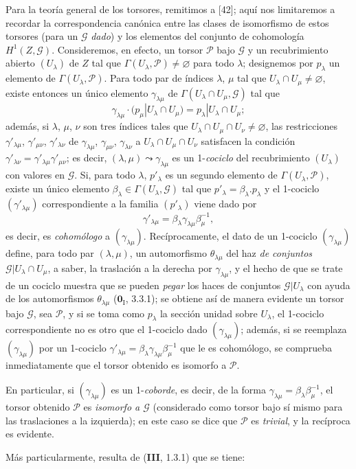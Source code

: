 \begin{env}[16.5.15]
Para la teoría general de los torsores, remitimos a [42]; aquí nos
limitaremos a recordar la correspondencia canónica entre las clases
de isomorfismo de estos torsores (para un $\mathscr{G}$ \emph{dado}) y los elementos del
conjunto de cohomología $H^1(Z,\mathscr{G})$. Consideremos, en efecto, un
torsor $\mathscr{P}$ bajo $\mathscr{G}$ y un recubrimiento abierto
$(U_\lambda)$ de $Z$ tal que
$\Gamma(U_\lambda,\mathscr{P})\neq\varnothing$ para todo $\lambda$;
designemos por $p_\lambda$ un elemento de
$\Gamma(U_\lambda,\mathscr{P})$. Para todo par de índices $\lambda$, $\mu$
tal que $U_\lambda\cap U_\mu\neq\varnothing$, existe entonces un único elemento
$\gamma_{\lambda\mu}$ de
$\Gamma(U_\lambda\cap U_\mu,\mathscr{G})$ tal que
\[
  \gamma_{\lambda\mu}\cdot
  (p_\mu|U_\lambda\cap U_\mu)=p_\lambda|U_\lambda\cap U_\mu;
\]
además, si $\lambda$, $\mu$, $\nu$ son tres índices tales que
$U_\lambda\cap U_\mu\cap U_\nu\neq\varnothing$, las restricciones
$\gamma'_{\lambda\mu}$, $\gamma'_{\mu\nu}$, $\gamma'_{\lambda\nu}$ de
$\gamma_{\lambda\mu}$, $\gamma_{\mu\nu}$, $\gamma_{\lambda\nu}$ a
$U_\lambda\cap U_\mu\cap U_\nu$ satisfacen la condición
$\gamma'_{\lambda\nu}=\gamma'_{\lambda\mu}\gamma'_{\mu\nu}$; es decir,
$(\lambda,\mu)\leadsto\gamma_{\lambda\mu}$ es un 1-\emph{cociclo} del
recubrimiento $(U_\lambda)$ con valores en $\mathscr{G}$. Si, para todo
$\lambda$, $p'_\lambda$ es un segundo elemento de
$\Gamma(U_\lambda,\mathscr{P})$, existe un único elemento
$\beta_\lambda\in\Gamma(U_\lambda,\mathscr{G})$ tal que
$p'_\lambda=\beta_\lambda.p_\lambda$ y el 1-cociclo
$(\gamma'_{\lambda\mu})$ correspondiente a la familia $(p'_\lambda)$ viene dado
por
\[
  \gamma'_{\lambda\mu}=\beta_\lambda\gamma_{\lambda\mu}\beta_\mu^{-1},
\]
es decir, es \emph{cohomólogo} a $(\gamma_{\lambda\mu})$.
Recíprocamente, el dato de un 1-cociclo $(\gamma_{\lambda\mu})$ define, para
todo par $(\lambda,\mu)$, un automorfismo $\theta_{\lambda\mu}$ del
haz \emph{de conjuntos}
$\mathscr{G}|U_\lambda\cap U_\mu$, a saber, la traslación a la derecha por
$\gamma_{\lambda\mu}$, y el hecho de que se trate de un cociclo muestra que se
pueden \emph{pegar} los haces de conjuntos $\mathscr{G}|U_\lambda$ con
ayuda de los automorfismos $\theta_{\lambda\mu}$ ($\mathbf{0}_{\mathrm I}$, 3.3.1); se obtiene así
de manera evidente un torsor bajo $\mathscr{G}$, sea $\mathscr{P}$, y si
se toma como $p_\lambda$ la sección unidad sobre $U_\lambda$, el
1-cociclo correspondiente no es otro que el 1-cociclo dado
$(\gamma_{\lambda\mu})$; además, si se reemplaza
$(\gamma_{\lambda\mu})$ por un 1-cociclo
$\gamma'_{\lambda\mu}=\beta_\lambda\gamma_{\lambda\mu}\beta_\mu^{-1}$ que
le es cohomólogo, se comprueba inmediatamente que el torsor obtenido es isomorfo
a $\mathscr{P}$.

En particular, si $(\gamma_{\lambda\mu})$ es un 1-\emph{coborde}, es decir,
de la forma
$\gamma_{\lambda\mu}=\beta_\lambda\beta_\mu^{-1}$, el torsor obtenido
$\mathscr{P}$ es \emph{isomorfo a $\mathscr{G}$} (considerado como torsor
bajo sí mismo para las traslaciones a la izquierda); en este caso se dice que
$\mathscr{P}$ es \emph{trivial}, y la recíproca es evidente.

Más particularmente, resulta de (\textbf{III}, 1.3.1) que se tiene:
\end{env}

